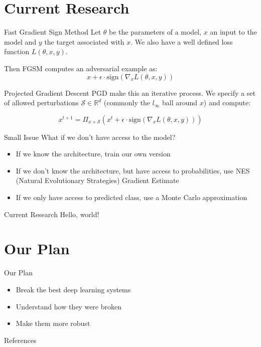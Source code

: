 \documentclass{beamer}
\begin{document}
\section{Current Research}

\begin{frame}{Fast Gradient Sign Method}
Let $\theta$ be the parameters of a model, $x$ an input to the model and $y$ the target associated with $x$.
We also have a well defined loss function $L(\theta, x, y)$.

\pause

Then FGSM computes an adversarial example as:
$$
x + \epsilon \cdot \text{sign}( \nabla_{x} L(\theta, x, y))
$$

\cite{Goodfellow_Shlens_Szegedy_2014}
\end{frame}

\begin{frame}{Projected Gradient Descent}
PGD make this an iterative process.
We specify a set of allowed perturbations $\mathcal{S} \in \mathbb{R}^{d}$ (commonly the $l_{\infty}$ ball around $x$) and compute:
\pause

$$
x^{t+1} = \Pi_{x + \mathcal{S}} (x^{t} + \epsilon \cdot \text{sign}(\nabla_{x} L(\theta, x, y)))
$$

\cite{Madry_Makelov_Schmidt_Tsipras_Vladu_2017}
\end{frame}


\begin{frame}{Small Issue}
What if we don't have access to the model?
\pause

\begin{itemize}
    \item If we know the architecture, train our own version
    \pause
    \item If we don't know the architecture, but have access to probabilities, use NES (Natural Evolutionary Strategies) Gradient Estimate \cite{Ilyas_Engstrom_Athalye_Lin_2018}
    \pause
    \item If we only have access to predicted class, use a Monte Carlo approximation \cite{Ilyas_Engstrom_Athalye_Lin_2018}
\end{itemize}
\end{frame}

\begin{frame}{Current Research}
Hello, world! \cite{Finlayson_Chung_Kohane_Beam_2018}
\end{frame}

\section{Our Plan}

\begin{frame}{Our Plan}
\begin{itemize}
    \item Break the best deep learning systems
    \pause
    \item Understand how they were broken
    \pause
    \item Make them more robust
\end{itemize}
\end{frame}



\begin{frame}[allowframebreaks]{References}
    \printbibliography
\end{frame}
\end{document}
